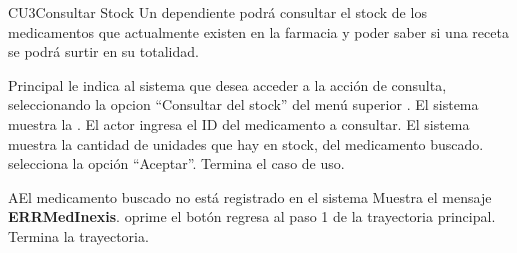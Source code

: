 
% 



	\begin{UseCase}{CU3}{Consultar Stock}{
		Un dependiente podrá consultar el stock de los medicamentos que actualmente existen en la farmacia y poder saber si una receta se podrá surtir en su totalidad.
	}
	\end{UseCase}

	\begin{UCtrayectoria}{Principal}
		\UCpaso[\UCactor] le indica al sistema que desea acceder a la acci\'on de consulta, seleccionando la opcion "`Consultar del stock"' del men\'u superior .
		\UCpaso El sistema muestra la \label{IUConsulta} .
		\UCpaso[\UCactor] El actor ingresa el ID del medicamento a consultar. 
		\UCpaso El sistema muestra la cantidad de unidades que hay en stock, del medicamento buscado. 
		\UCpaso [\UCactor] selecciona la opción "`Aceptar"'. 
		\UCpaso[] Termina el caso de uso.
	\end{UCtrayectoria}
		
		\begin{UCtrayectoriaA}{A}{El medicamento buscado no est\'a registrado en el sistema}
			\UCpaso Muestra el mensaje {\bf ERRMedInexis}.
			\UCpaso[\UCactor] oprime el botón 
			\UCPaso[\UCactor] regresa al paso 1 de la trayectoria principal.  
			\UCpaso[] Termina la trayectoria.
		\end{UCtrayectoriaA}
		
		
		
